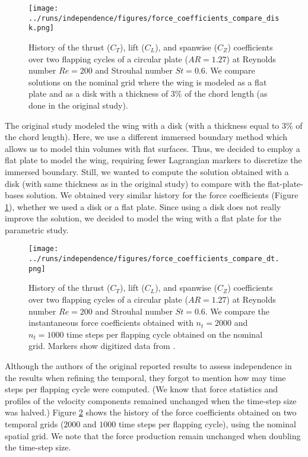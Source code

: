\begin{figure}
  \centering
  \texttt{[image: ../runs/independence/figures/force\_coefficients\_compare\_disk.png]}
  \caption{History of the thrust ($C_T$), lift ($C_L$), and spanwise ($C_Z$) coefficients over two flapping cycles of a circular plate ($AR = 1.27$) at Reynolds number $Re = 200$ and Strouhal number $St = 0.6$. We compare solutions on the nominal grid where the wing is modeled as a flat plate and as a disk with a thickness of $3\%$ of the chord length (as done in the original study\supercite{li_dong_2016}).}
  \label{fig:independence_force_coefficients_disk}
\end{figure}

The original study modeled the wing with a disk (with a thickness equal to $3\%$ of the chord length).
Here, we use a different immersed boundary method which allows us to model thin volumes with flat surfaces.
Thus, we decided to employ a flat plate to model the wing, requiring fewer Lagrangian markers to discretize the immersed boundary.
Still, we wanted to compute the solution obtained with a disk (with same thickness as in the original study) to compare with the flat-plate-bases solution.
We obtained very similar history for the force coefficients (Figure \ref{fig:independence_force_coefficients_disk}), whether we used a disk or a flat plate.
Since using a disk does not really improve the solution, we decided to model the wing with a flat plate for the parametric study.

\begin{figure}
  \centering
  \texttt{[image: ../runs/independence/figures/force\_coefficients\_compare\_dt.png]}
  \caption{History of the thrust ($C_T$), lift ($C_L$), and spanwise ($C_Z$) coefficients over two flapping cycles of a circular plate ($AR = 1.27$) at Reynolds number $Re = 200$ and Strouhal number $St = 0.6$. We compare the instantaneous force coefficients obtained with $n_t = 2000$ and $n_t = 1000$ time steps per flapping cycle obtained on the nominal grid. Markers show digitized data from \citet{li_dong_2016}.}
  \label{fig:independence_force_coefficients_dt}
\end{figure}

Although the authors of the original reported results to assess independence in the results when refining the temporal, they forgot to mention how may time steps per flapping cycle were computed.
(We know that force statistics and profiles of the velocity components remained unchanged when the time-step size was halved.)
Figure \ref{fig:independence_force_coefficients_dt} shows the history of the force coefficients obtained on two temporal grids ($2000$ and $1000$ time steps per flapping cycle), using the nominal spatial grid.
We note that the force production remain unchanged when doubling the time-step size.

